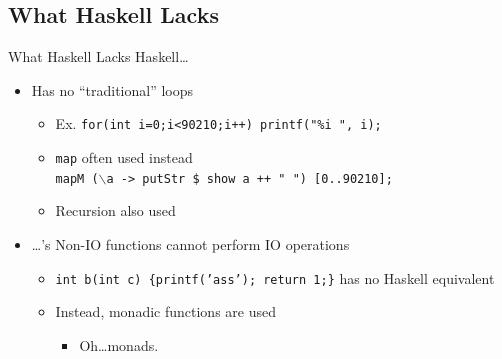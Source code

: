 \documentclass{beamer}
\begin{document}
		\subsection{What Haskell Lacks}
			\begin{frame}{What Haskell Lacks}
				Haskell\dots
				\begin{itemize}
					\item Has no ``traditional'' loops
					\begin{itemize}
						\item Ex. \texttt{for(int i=0;i<90210;i++) printf("\%i ", i);}
						\item \texttt{map} often used instead\\
							\texttt{mapM ($\backslash$a -> putStr \$ show a ++ " ") [0..90210];}
						\item Recursion also used
					\end{itemize}
					\item \dots's Non-IO functions cannot perform IO operations
					\begin{itemize}
						\item \texttt{int b(int c) \{printf('ass'); return 1;\}}
							has no Haskell equivalent
						\item Instead, monadic functions are used
						\begin{itemize}
							\item Oh\dots monads.
						\end{itemize}
					\end{itemize}
				\end{itemize}
			\end{frame}
\end{document}
